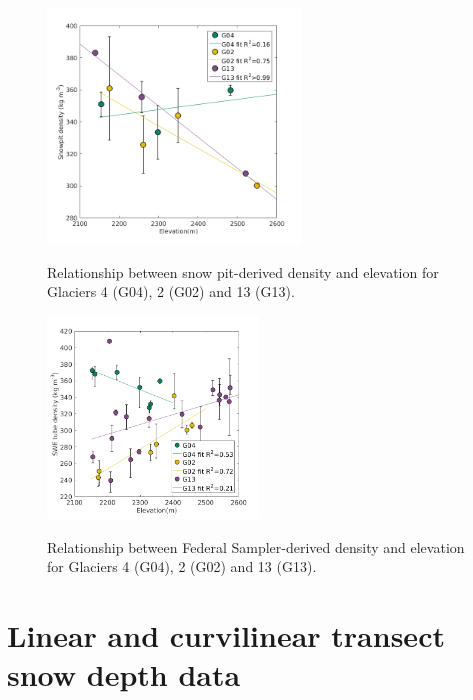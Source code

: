 \documentclass{sfuthesis}
\begin{document}
\begin{figure}[H]
	\centering
	\includegraphics[width = 0.6\textwidth]{ElevationVsSnowpit_all.png}\\
	\caption{Relationship between snow pit-derived density and elevation for Glaciers 4 (G04), 2 (G02) and 13 (G13).}
	\label{fig:elev_snowpit}
\end{figure}


\begin{figure}[H]
	\centering
	\includegraphics[width = 0.5\textwidth]{ElevationVsSWEtube_all.png}\\
	\caption{Relationship between Federal Sampler-derived density and elevation for Glaciers 4 (G04), 2 (G02) and 13 (G13).}
	\label{fig:elev_tube}
\end{figure}


\section{Linear and curvilinear transect snow depth data}
\end{document}
